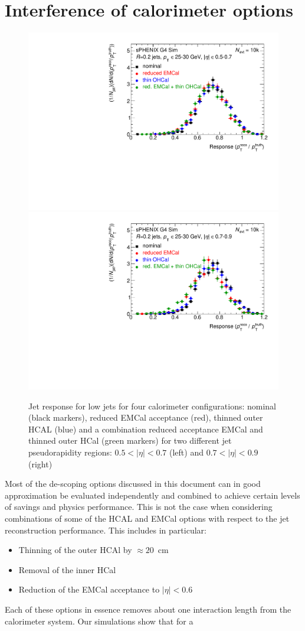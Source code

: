 \section{Interference of calorimeter options}
\begin{figure}[hbt]
  \centering
  \includegraphics[width=0.4\linewidth]{figs/h1_etascan_response_ETA1}
  \hspace{0.1\linewidth}  
  \includegraphics[width=0.4\linewidth]{figs/h1_etascan_response_ETA2}
  \caption{Jet response for low \pt jets for four calorimeter configurations:
   nominal (black markers), reduced EMCal acceptance (red), thinned outer HCAL (blue) and a combination
   reduced acceptance EMCal and thinned outer HCal (green markers) for two different jet pseudorapidity regions: $0.5 < |\eta| < 0.7$ (left) and 
$0.7 < |\eta| < 0.9$ (right) }
  \label{fig:JetResponse25GeV_CaloStackVariants_Nevt20k}
\end{figure}
Most of the de-scoping options discussed in this document can in good approximation be evaluated independently and combined to achieve certain levels of savings 
and physics performance. This is not the case when considering combinations of some of the HCAL and EMCal options with respect to the 
jet reconstruction performance. This includes in particular:
\begin{itemize}
\item Thinning of the outer HCAl by $\approx 20$~cm
\item Removal of the inner HCal
\item Reduction of the EMCal acceptance to $|\eta| < 0.6$
\end{itemize}
Each of these options in essence removes about one interaction length from the calorimeter system. Our simulations show that for a 
